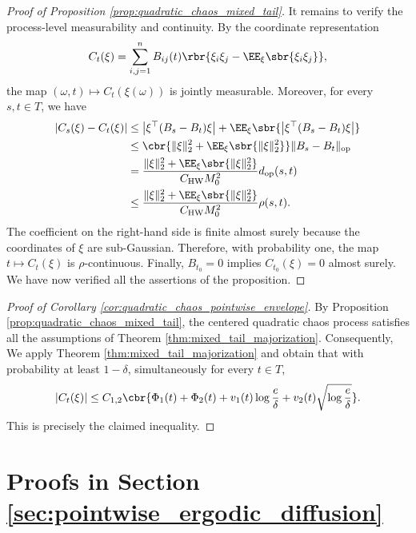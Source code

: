 \documentclass[11pt]{article}
\begin{document}
\begin{proof}[Proof of Proposition
\ref{prop:quadratic_chaos_mixed_tail}]
It remains to verify the process-level measurability and continuity.
By the coordinate representation
\begin{align*}
C_t(\xi)
=
\sum_{i,j=1}^n
B_{ij}(t)
\rbr{
\xi_i\xi_j-\EE_\xi\sbr{\xi_i\xi_j}
},
\end{align*}
the map $(\omega,t)\mapsto C_t(\xi(\omega))$ is jointly measurable. Moreover, for every $s,t\in T$, we have
\begin{align*}
|C_s(\xi)-C_t(\xi)|
&\le
\left|
\xi^\top(B_s-B_t)\xi
\right|
+\EE_\xi\sbr{
\left|
\xi^\top(B_s-B_t)\xi
\right|
}\\
&\le
\cbr{
\|\xi\|_2^2
+\EE_\xi\sbr{\|\xi\|_2^2}
}
\|B_s-B_t\|_{\mathrm{op}}\\
&=
\frac{
\|\xi\|_2^2
+\EE_\xi\sbr{\|\xi\|_2^2}
}{
C_{\mathrm{HW}}M_0^2
}
d_{\mathrm{op}}(s,t)\\
&\le
\frac{
\|\xi\|_2^2
+\EE_\xi\sbr{\|\xi\|_2^2}
}{
C_{\mathrm{HW}}M_0^2
}
\rho(s,t).
\end{align*}
The coefficient on the right-hand side is finite almost surely because
the coordinates of $\xi$ are sub-Gaussian. Therefore, with
probability one, the map $t\longmapsto C_t(\xi)$ is $\rho$-continuous. Finally, $B_{t_0}=0$ implies
$C_{t_0}(\xi)=0$ almost surely. We have now verified all the assertions
of the proposition.
\end{proof}

\begin{proof}[Proof of Corollary
\ref{cor:quadratic_chaos_pointwise_envelope}]
By Proposition \ref{prop:quadratic_chaos_mixed_tail}, the centered
quadratic chaos process satisfies all the assumptions of Theorem
\ref{thm:mixed_tail_majorization}.
Consequently, We apply Theorem \ref{thm:mixed_tail_majorization} and obtain that with
probability at least $1-\delta$, simultaneously for every $t\in T$,
\begin{align*}
|C_t(\xi)|
\le
C_{1,2}
\cbr{
\Phi_{1}(t)
+\Phi_{2}(t)
+v_{1}(t)\log\frac{e}{\delta}
+v_{2}(t)
\sqrt{\log\frac{e}{\delta}}
}.
\end{align*}
This is precisely the claimed inequality.
\end{proof}
\fi





\section{Proofs in Section \ref{sec:pointwise_ergodic_diffusion}}
\label{app:proofs_diffusion}
\end{document}
